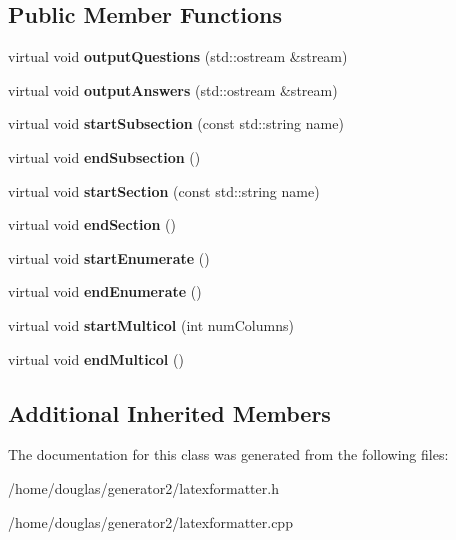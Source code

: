 \subsection*{Public Member Functions}
\begin{DoxyCompactItemize}
\item 
virtual void {\bfseries output\+Questions} (std\+::ostream \&stream)\hypertarget{classLatexFormatter_a23b1afa4afa66cce9da3b5f6fa710aba}{}\label{classLatexFormatter_a23b1afa4afa66cce9da3b5f6fa710aba}

\item 
virtual void {\bfseries output\+Answers} (std\+::ostream \&stream)\hypertarget{classLatexFormatter_ab51c89a5df17ce203bb941b1ce9c8e13}{}\label{classLatexFormatter_ab51c89a5df17ce203bb941b1ce9c8e13}

\item 
virtual void {\bfseries start\+Subsection} (const std\+::string name)\hypertarget{classLatexFormatter_a22c697e684abe2e905ab56fd24b937ca}{}\label{classLatexFormatter_a22c697e684abe2e905ab56fd24b937ca}

\item 
virtual void {\bfseries end\+Subsection} ()\hypertarget{classLatexFormatter_ad5b3f325dad0606582d0b035bb183a7b}{}\label{classLatexFormatter_ad5b3f325dad0606582d0b035bb183a7b}

\item 
virtual void {\bfseries start\+Section} (const std\+::string name)\hypertarget{classLatexFormatter_ac6f15873968fb1eebd6174b3ced286dc}{}\label{classLatexFormatter_ac6f15873968fb1eebd6174b3ced286dc}

\item 
virtual void {\bfseries end\+Section} ()\hypertarget{classLatexFormatter_a029082cd3679671d4e495729b1d61937}{}\label{classLatexFormatter_a029082cd3679671d4e495729b1d61937}

\item 
virtual void {\bfseries start\+Enumerate} ()\hypertarget{classLatexFormatter_a6022104c77fa63e6f2e24358332680d6}{}\label{classLatexFormatter_a6022104c77fa63e6f2e24358332680d6}

\item 
virtual void {\bfseries end\+Enumerate} ()\hypertarget{classLatexFormatter_a748169a459f18cad265869eb78695573}{}\label{classLatexFormatter_a748169a459f18cad265869eb78695573}

\item 
virtual void {\bfseries start\+Multicol} (int num\+Columns)\hypertarget{classLatexFormatter_a116a899aed65c94e4c947ae4a84f7f17}{}\label{classLatexFormatter_a116a899aed65c94e4c947ae4a84f7f17}

\item 
virtual void {\bfseries end\+Multicol} ()\hypertarget{classLatexFormatter_abbb50fd475c80e682baf0364e28ae82b}{}\label{classLatexFormatter_abbb50fd475c80e682baf0364e28ae82b}

\end{DoxyCompactItemize}
\subsection*{Additional Inherited Members}


The documentation for this class was generated from the following files\+:\begin{DoxyCompactItemize}
\item 
/home/douglas/generator2/latexformatter.\+h\item 
/home/douglas/generator2/latexformatter.\+cpp\end{DoxyCompactItemize}
